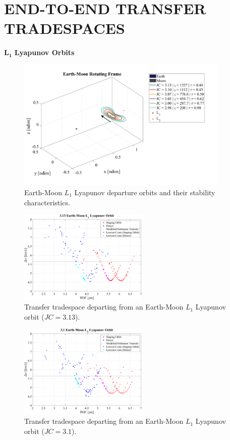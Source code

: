 \chapter{END-TO-END TRANSFER TRADESPACES}\label{chap:Tradespaces}

$\pmb{L_{1}}$ \textbf{Lyapunov Orbits}
\begin{figure}[ht]
    \centering
    \includegraphics[width=0.9\textwidth]{figures/L1LyapunovDepartureOrbits.pdf}
    \caption{Earth-Moon $L_{1}$ Lyapunov departure orbits and their stability characteristics.}
\end{figure}

\begin{figure}[ht]
    \centering
    \includegraphics[width=0.55\textwidth]{figures/TradeSpace_L1Lyapunov_3_13.pdf}
    \caption{Transfer tradespace departing from an Earth-Moon $L_{1}$ Lyapunov orbit ($JC=3.13$).}
\end{figure}

\begin{figure}[ht]
    \centering
    \includegraphics[width=0.55\textwidth]{figures/TradeSpace_L1Lyapunov_3_10.pdf}
    \caption{Transfer tradespace departing from an Earth-Moon $L_{1}$ Lyapunov orbit ($JC=3.1$).}
\end{figure}

